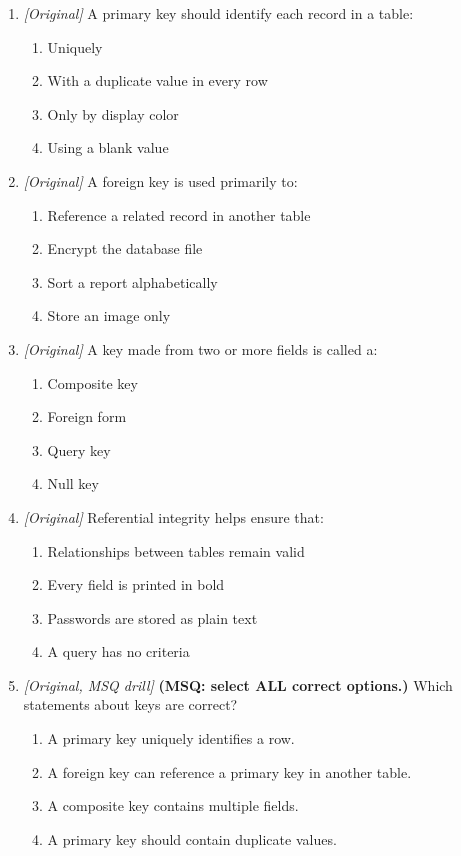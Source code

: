 \begin{enumerate}[label=\textbf{Q\arabic*.}, leftmargin=*]
\begin{enumerate}[label=\Alph*.]
    \item Every table must contain a printer serial number.
  \end{enumerate}
\item \textit{[Original]} A primary key should identify each record in a table:
  \begin{enumerate}[label=\Alph*.]
\item Uniquely
   \item With a duplicate value in every row
   \item Only by display color
   \item Using a blank value
  \end{enumerate}

\item \textit{[Original]} A foreign key is used primarily to:
  \begin{enumerate}[label=\Alph*.]
\item Reference a related record in another table
   \item Encrypt the database file
   \item Sort a report alphabetically
   \item Store an image only
  \end{enumerate}

\item \textit{[Original]} A key made from two or more fields is called a:
  \begin{enumerate}[label=\Alph*.]
\item Composite key
   \item Foreign form
   \item Query key
   \item Null key
  \end{enumerate}

\item \textit{[Original]} Referential integrity helps ensure that:
  \begin{enumerate}[label=\Alph*.]
\item Relationships between tables remain valid
   \item Every field is printed in bold
   \item Passwords are stored as plain text
   \item A query has no criteria
  \end{enumerate}

\item \textit{[Original, MSQ drill]} \textbf{(MSQ: select ALL correct options.)} Which statements about keys are correct?
  \begin{enumerate}[label=\Alph*.]
\item A primary key uniquely identifies a row.
   \item A foreign key can reference a primary key in another table.
   \item A composite key contains multiple fields.
   \item A primary key should contain duplicate values.
  \end{enumerate}

\end{enumerate}
